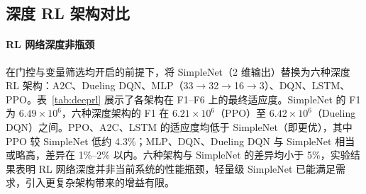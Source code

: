 \documentclass[conference]{IEEEtran}
\begin{document}
\subsection{深度 RL 架构对比}

\paragraph{RL 网络深度非瓶颈} 在门控与变量筛选均开启的前提下，将 SimpleNet（2 维输出）替换为六种深度 RL 架构：A2C、Dueling DQN、MLP（33\(\to\)32\(\to\)16\(\to\)3）、DQN、LSTM、PPO。表~\ref{tab:deeprl} 展示了各架构在 F1--F6 上的最终适应度。SimpleNet 的 F1 为 \(6.49 \times 10^6\)，六种深度架构的 F1 在 \(6.21 \times 10^6\)（PPO）至 \(6.42 \times 10^6\)（Dueling DQN）之间。PPO、A2C、LSTM 的适应度均低于 SimpleNet（即更优），其中 PPO 较 SimpleNet 低约 4.3\%；MLP、DQN、Dueling DQN 与 SimpleNet 相当或略高，差异在 1\%--2\% 以内。六种架构与 SimpleNet 的差异均小于 5\%，实验结果表明 RL 网络深度并非当前系统的性能瓶颈，轻量级 SimpleNet 已能满足需求，引入更复杂架构带来的增益有限。
\end{document}
